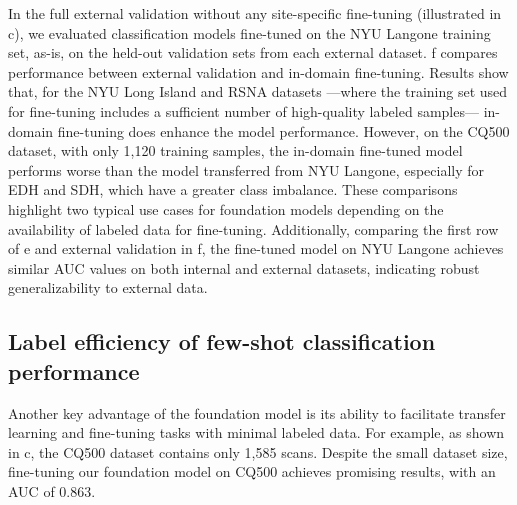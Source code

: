 \documentclass[fleqn,10pt]{wlscirep}
\begin{document}
In the full external validation without any site-specific fine-tuning (illustrated in c), we evaluated classification models fine-tuned on the NYU Langone training set, as-is, on the held-out validation sets from each external dataset. f compares performance between external validation and in-domain fine-tuning. Results show that, for the NYU Long Island and RSNA datasets —where the training set used for fine-tuning includes a sufficient number of high-quality labeled samples— in-domain fine-tuning does enhance the model performance. However, on the CQ500 dataset, with only 1,120 training samples, the in-domain fine-tuned model performs worse than the model transferred from NYU Langone, especially for EDH and SDH, which have a greater class imbalance. These comparisons highlight two typical use cases for foundation models depending on the availability of labeled data for fine-tuning. Additionally, comparing the first row of e and external validation in f, the fine-tuned model on NYU Langone achieves similar AUC values on both internal and external datasets, indicating robust generalizability to external data.











\subsection*{Label efficiency of few-shot classification performance}
\label{sec:label_efficiency}

Another key advantage of the foundation model is its ability to facilitate transfer learning and fine-tuning tasks with minimal labeled data. For example, as shown in c, the CQ500 dataset contains only 1,585 scans. Despite the small dataset size, fine-tuning our foundation model on CQ500 achieves promising results, with an AUC of 0.863. 
\end{document}
